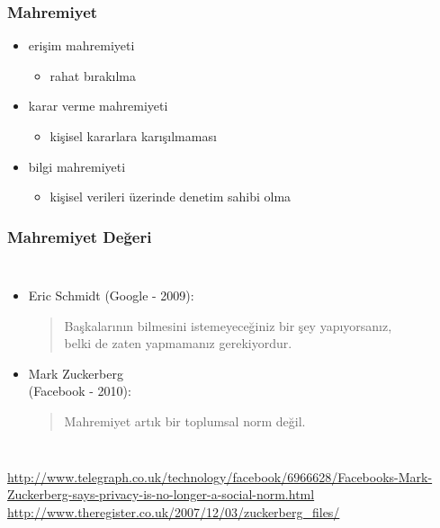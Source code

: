 \documentclass[dvipsnames]{beamer}
\theoremstyle{definition}
\theoremstyle{example}
\theoremstyle{plain}
\begin{document}
\begin{frame}
  \frametitle{Mahremiyet}

  \begin{itemize}
    \item erişim mahremiyeti
    \begin{itemize}
      \item rahat bırakılma
    \end{itemize}

    \pause
    \item karar verme mahremiyeti
    \begin{itemize}
      \item kişisel kararlara karışılmaması
    \end{itemize}

    \pause
    \item bilgi mahremiyeti
    \begin{itemize}
      \item kişisel verileri üzerinde denetim sahibi olma
    \end{itemize}
  \end{itemize}
\end{frame}

\begin{frame}
  \frametitle{Mahremiyet Değeri}

  \begin{columns}

    \begin{itemize}
      \item Eric Schmidt (Google - 2009):
      \begin{quote}
        Başkalarının bilmesini istemeyeceğiniz bir şey yapıyorsanız,\\
        belki de zaten yapmamanız gerekiyordur.
      \end{quote}

      \pause
      \item Mark Zuckerberg\\
        (Facebook - 2010):
      \begin{quote}
        Mahremiyet artık bir toplumsal norm değil.
      \end{quote}
    \end{itemize}
  \end{columns}

  \medskip
  \tiny{\url{http://www.telegraph.co.uk/technology/facebook/6966628/Facebooks-Mark-Zuckerberg-says-privacy-is-no-longer-a-social-norm.html}}\\
  \tiny{\url{http://www.theregister.co.uk/2007/12/03/zuckerberg_files/}}\\
\end{frame}
\end{document}
